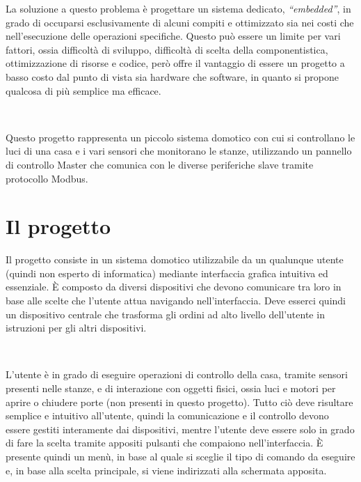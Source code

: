 \documentclass[a4paper,titlepage]{book}
\begin{document}
La soluzione a questo problema è progettare un sistema dedicato, \textit{``embedded''}, in grado di occuparsi esclusivamente di alcuni compiti e ottimizzato sia nei costi che nell'esecuzione delle operazioni specifiche. Questo può essere un limite per vari fattori, ossia difficoltà di sviluppo, difficoltà di scelta della componentistica, ottimizzazione di risorse e codice, però offre il vantaggio di essere un progetto a basso costo dal punto di vista sia hardware che software, in quanto si propone qualcosa di più semplice ma efficace.

~

Questo progetto rappresenta un piccolo sistema domotico con cui si controllano le luci di una casa e i vari sensori che monitorano le stanze, utilizzando un pannello di controllo Master che comunica con le diverse periferiche slave tramite protocollo Modbus.


\tableofcontents




\chapter{Il progetto}

Il progetto consiste in un sistema domotico utilizzabile da un qualunque utente (quindi non esperto di informatica) mediante interfaccia grafica intuitiva ed essenziale. È composto da diversi dispositivi che devono comunicare tra loro in base alle scelte che l'utente attua navigando nell'interfaccia. Deve esserci quindi un dispositivo centrale che trasforma gli ordini ad alto livello dell'utente in istruzioni per gli altri dispositivi.

~

L'utente è in grado di eseguire operazioni di controllo della casa, tramite sensori presenti nelle stanze, e di interazione con oggetti fisici, ossia luci e motori per aprire o chiudere porte (non presenti in questo progetto). Tutto ciò deve risultare semplice e intuitivo all'utente, quindi la comunicazione e il controllo devono essere gestiti interamente dai dispositivi, mentre l'utente deve essere solo in grado di fare la scelta tramite appositi pulsanti che compaiono nell'interfaccia. È presente quindi un menù, in base al quale si sceglie il tipo di comando da eseguire e, in base alla scelta principale, si viene indirizzati alla schermata apposita.
\end{document}

